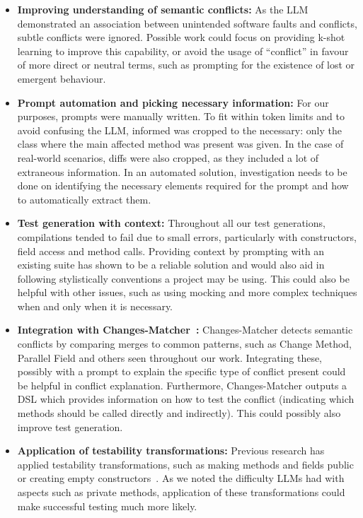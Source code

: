 \begin{itemize}
\item \textbf{Improving understanding of semantic conflicts:} As the LLM demonstrated an association between unintended software faults and conflicts, subtle conflicts were ignored.
Possible work could focus on providing k-shot learning to improve this capability, or avoid the usage of ``conflict'' in favour of more direct or neutral terms, such as prompting
for the existence of lost or emergent behaviour.

\item \textbf{Prompt automation and picking necessary information:} For our purposes, prompts were manually written. To fit within token limits and to avoid confusing the LLM, informed was cropped to
the necessary: only the class where the main affected method was present was given. In the case of real-world scenarios, diffs were also cropped, as they included a lot of extraneous information.
In an automated solution, investigation needs to be done on identifying the necessary elements required for the prompt and how to automatically extract them.

\item \textbf{Test generation with context:} Throughout all our test generations, compilations tended to fail due to small errors, particularly with constructors, field access and method calls.
Providing context by prompting with an existing suite has shown to be a reliable solution and would also aid in following stylistically conventions a project may be using.
This could also be helpful with other issues, such as using mocking and more complex techniques when and only when it is necessary.

\item \textbf{Integration with Changes-Matcher~\cite{kn:nuno}:} Changes-Matcher detects semantic conflicts by comparing merges to common patterns, such as Change Method, Parallel Field and others
seen throughout our work. Integrating these, possibly with a prompt to explain the specific type of conflict present could be helpful in conflict explanation.
Furthermore, Changes-Matcher outputs a DSL which provides information on how to test the conflict (indicating which methods should be called directly and indirectly). This could possibly
also improve test generation.

\item \textbf{Application of testability transformations:} Previous research has applied testability transformations, such as making methods and fields public or creating empty constructors~\cite{kn:leuson}.
As we noted the difficulty LLMs had with aspects such as private methods, application of these transformations could make successful testing much more likely.
\end{itemize}

